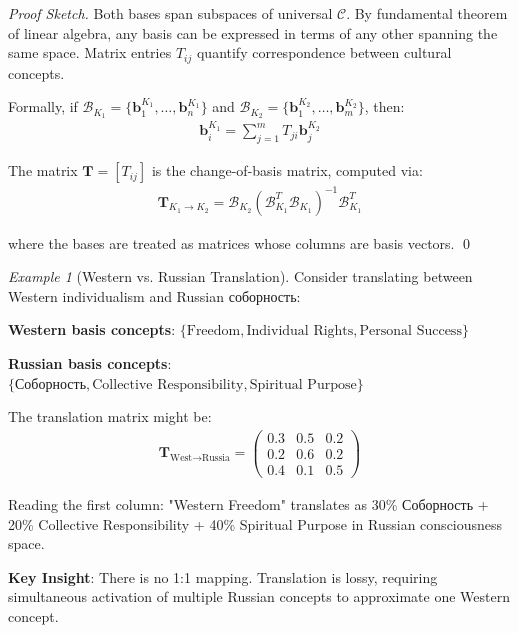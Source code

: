 \documentclass[11pt,a4paper]{article}
\theoremstyle{definition}
\theoremstyle{remark}
\newtheorem{example}{Example}[section]
\newcommand{\CC}{\mathcal{C}}
\newcommand{\bb}{\mathbf{b}}
\newcommand{\TT}{\mathbf{T}}
\begin{document}
\begin{proof}[Proof Sketch]
Both bases span subspaces of universal \(\CC\). By fundamental theorem of linear algebra, any basis can be expressed in terms of any other spanning the same space. Matrix entries \(T_{ij}\) quantify correspondence between cultural concepts.

Formally, if \(\mathcal{B}_{K_1} = \{\bb_1^{K_1}, \ldots, \bb_n^{K_1}\}\) and \(\mathcal{B}_{K_2} = \{\bb_1^{K_2}, \ldots, \bb_m^{K_2}\}\), then:
\begin{align}
\bb_i^{K_1} = \sum_{j=1}^m T_{ji} \bb_j^{K_2}
\end{align}

The matrix \(\TT = [T_{ij}]\) is the change-of-basis matrix, computed via:
\begin{align}
\TT_{K_1 \to K_2} = \mathcal{B}_{K_2} (\mathcal{B}_{K_1}^T \mathcal{B}_{K_1})^{-1} \mathcal{B}_{K_1}^T
\end{align}

where the bases are treated as matrices whose columns are basis vectors. \qed
\end{proof}

\begin{example}[Western vs. Russian Translation]
Consider translating between Western individualism and Russian соборность:

\textbf{Western basis concepts}: \(\{\text{Freedom}, \text{Individual Rights}, \text{Personal Success}\}\)

\textbf{Russian basis concepts}: \(\{\text{Соборность}, \text{Collective Responsibility}, \text{Spiritual Purpose}\}\)

The translation matrix might be:
\begin{align}
\TT_{\text{West} \to \text{Russia}} = \begin{pmatrix}
0.3 & 0.5 & 0.2 \\
0.2 & 0.6 & 0.2 \\
0.4 & 0.1 & 0.5
\end{pmatrix}
\end{align}

Reading the first column: "Western Freedom" translates as 30\% Соборность + 20\% Collective Responsibility + 40\% Spiritual Purpose in Russian consciousness space.

\textbf{Key Insight}: There is no 1:1 mapping. Translation is lossy, requiring simultaneous activation of multiple Russian concepts to approximate one Western concept.
\end{example}
\end{document}

